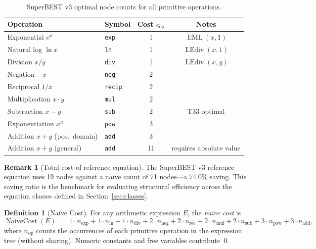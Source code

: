 \documentclass[12pt,a4paper]{article}
\theoremstyle{definition}
\newtheorem{definition}[theorem]{Definition}
\newtheorem{remark}[theorem]{Remark}
\newcommand{\EML}{\operatorname{EML}}
\newcommand{\LEdiv}{\operatorname{LEdiv}}
\newcommand{\NC}{\operatorname{NaiveCost}}
\begin{document}
\begin{table}[h]
\centering
\caption{SuperBEST v3 optimal node counts for all primitive operations.}
\label{tab:superbest3}
\smallskip
\begin{tabular}{@{}llcc@{}}
\toprule
\textbf{Operation} & \textbf{Symbol} &
  \textbf{Cost $c_{\mathrm{op}}$} & \textbf{Notes} \\
\midrule
Exponential $e^x$           & \texttt{exp}   & 1 & $\EML(x,1)$ \\
Natural log $\ln x$         & \texttt{ln}    & 1 & $\LEdiv(x,1)$ \\
Division $x/y$              & \texttt{div}   & 1 & $\LEdiv(x,y)$ \\
Negation $-x$               & \texttt{neg}   & 2 & \\
Reciprocal $1/x$            & \texttt{recip} & 2 & \\
Multiplication $x \cdot y$  & \texttt{mul}   & 2 & \\
Subtraction $x - y$         & \texttt{sub}   & 2 & T33 optimal \\
Exponentiation $x^n$        & \texttt{pow}   & 3 & \\
Addition $x + y$ (pos.\ domain) & \texttt{add} & 3 & \\
Addition $x + y$ (general)  & \texttt{add}   & 11 & requires absolute value \\
\bottomrule
\end{tabular}
\end{table}

\begin{remark}[Total cost of reference equation]
\label{rem:19node}
The SuperBEST v3 reference equation uses 19 nodes against a na\"{i}ve count of
71 nodes---a 74.0\% saving.  This saving ratio is the benchmark for evaluating
structural efficiency across the equation classes defined in
Section~\ref{sec:classes}.
\end{remark}

\begin{definition}[Na\"{i}ve Cost]
\label{def:NC}
For any arithmetic expression $E$, the \emph{na\"{i}ve cost} is
\[
  \NC(E) \;=\;
    1 \cdot n_{\exp}
  + 1 \cdot n_{\ln}
  + 1 \cdot n_{\mathrm{div}}
  + 2 \cdot n_{\mathrm{neg}}
  + 2 \cdot n_{\mathrm{rec}}
  + 2 \cdot n_{\mathrm{mul}}
  + 2 \cdot n_{\mathrm{sub}}
  + 3 \cdot n_{\mathrm{pow}}
  + 3 \cdot n_{\mathrm{add}},
\]
where $n_{\mathrm{op}}$ counts the occurrences of each primitive operation in the
expression tree (without sharing).  Numeric constants and free variables
contribute~0.
\end{definition}
\end{document}
